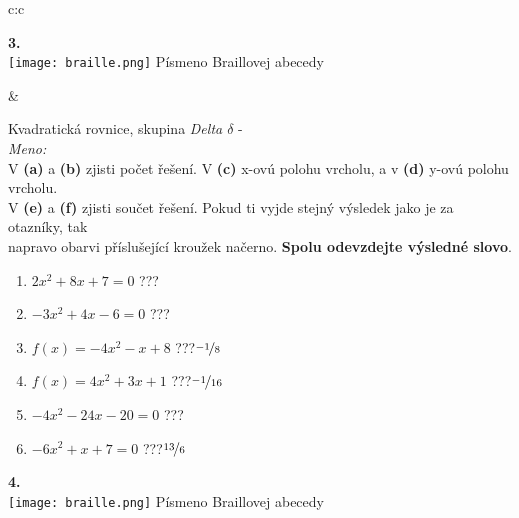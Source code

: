 \documentclass[10pt]{report}
\begin{document}
\begin{tabular}{c:c}
\begin{minipage}[c][99mm][t]{0.49\linewidth}
\begin{center}
\begin{minipage}{0.20\linewidth}
\begin{center}
{\Huge\bfseries 3.} \\[2mm]
\texttt{[image: braille.png]}
{\small Písmeno Braillovej abecedy}
\end{center}
\end{minipage}
\end{center}
\end{minipage}
&
\begin{minipage}[c][99mm][t]{0.49\linewidth}
\begin{center}
\vspace{7mm}
{\huge Kvadratická rovnice, skupina \textit{Delta $\delta$} -}\\[4.5mm]
\textit{Meno:}\phantom{xxxxxxxxxxxxxxxxxxxxxxxxxxxxxxxxxxxxxxxxxxxxxxxxxxxxxxxxxxxxxxxxx}\\[3.5mm]
V \textbf{(a)} a \textbf{(b)} zjisti počet řešení. V \textbf{(c)} x-ovú polohu vrcholu, a v \textbf{(d)} y-ovú polohu vrcholu.\\V \textbf{(e)} a \textbf{(f)} zjisti součet řešení. Pokud ti vyjde stejný výsledek jako je za otazníky, tak\\napravo obarvi příslušející kroužek načerno. \textbf{Spolu odevzdejte výsledné slovo}.\\[3mm]
\begin{minipage}{0.77\linewidth}
\begin{center}
\begin{varwidth}{\textwidth}
\begin{enumerate}
\large
\item $2x^2+8x+7=0$\quad \dotfill\; ???\;\dotfill {}
\item $-3x^2+4x-6=0$\quad \dotfill\; ???\;\dotfill {}
\item $f(x)=-4x^2-x+8$\quad \dotfill\; ???\;\dotfill \quad $\nicefrac{-1}{8}$
\item $f(x)=4x^2+3x+1$\quad \dotfill\; ???\;\dotfill \quad $\nicefrac{-1}{16}$
\item $-4x^2-24x-20=0$\quad \dotfill\; ???\;\dotfill {}
\item $-6x^2+x+7=0$\quad \dotfill\; ???\;\dotfill \quad $\nicefrac{13}{6}$
\end{enumerate}
\end{varwidth}
\end{center}
\end{minipage}
\begin{minipage}{0.20\linewidth}
\begin{center}
{\Huge\bfseries 4.} \\[2mm]
\texttt{[image: braille.png]}
{\small Písmeno Braillovej abecedy}
\end{center}
\end{minipage}
\end{center}
\end{minipage}

\end{tabular}
\end{document}
